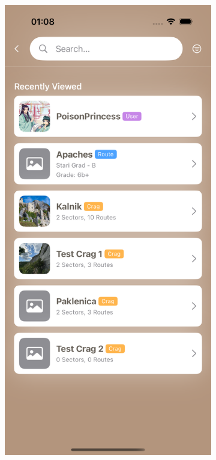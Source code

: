 \begin{figure}[H]
\begin{subfigure}[b]{0.35\textwidth}
        \includegraphics[width=\textwidth]{images/implementacija/search_default.png}

\end{subfigure}
\end{figure}
